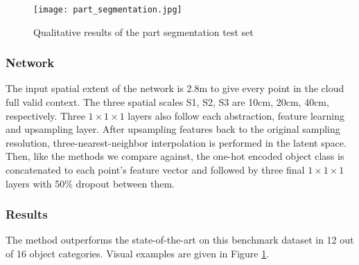 \documentclass[runningheads]{llncs}
\begin{document}
\begin{figure}[h]
    \centering
  \texttt{[image: part\_segmentation.jpg]} 
    \caption{Qualitative results of the part segmentation test set}
    \label{fig:part_segm_vis} 
\end{figure}

\subsubsection{Network}

The input spatial extent of the network is 2.8m to give every point in the cloud full valid context. The three spatial scales S1, S2, S3 are 10cm, 20cm, 40cm, respectively.  Three $1\times 1\times 1$ layers also follow each abstraction, feature learning and upsampling layer. After upsampling features back to the original sampling resolution, three-nearest-neighbor interpolation is performed in the latent space. Then, like the methods we compare against, the one-hot encoded object class is concatenated to each point's feature vector and followed by three final $1\times 1\times 1$ layers with 50\% dropout between them.

\subsubsection{Results}

The method outperforms the state-of-the-art on this benchmark dataset in 12 out of 16 object categories. Visual examples are given in Figure \ref{fig:part_segm_vis}. 
\end{document}
